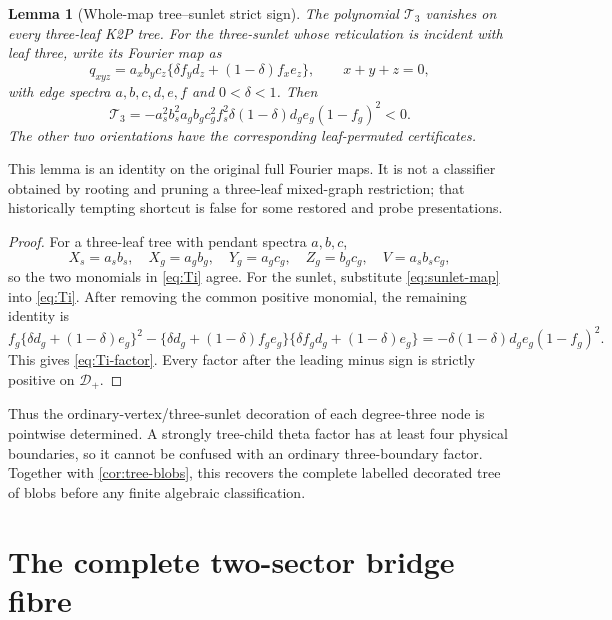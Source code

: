 \documentclass[11pt]{article}
\newtheorem{lemma}[theorem]{Lemma}
\theoremstyle{remark}
\newcommand{\Dplus}{\mathcal D_+}
\newcommand{\1}{\mathbf 1}
\begin{document}
\begin{lemma}[Whole-map tree--sunlet strict sign]\label{lem:Ti}
The polynomial \(\mathcal T_3\) vanishes on every three-leaf K2P tree.  For
the three-sunlet whose reticulation is incident with leaf three, write its
Fourier map as
\begin{equation}\label{eq:sunlet-map}
 q_{xyz}=a_xb_yc_z\{\delta f_y d_z+(1-\delta)f_xe_z\},
 \qquad x+y+z=0,
\end{equation}
with edge spectra \(a,b,c,d,e,f\) and \(0<\delta<1\).  Then
\begin{equation}\label{eq:Ti-factor}
 \mathcal T_3=
 -a_s^2b_s^2a_gb_gc_g^2f_s^2
 \delta(1-\delta)d_ge_g(1-f_g)^2<0.
\end{equation}
The other two orientations have the corresponding leaf-permuted
certificates.
\end{lemma}

This lemma is an identity on the original full Fourier maps.  It is not a
classifier obtained by rooting and pruning a three-leaf mixed-graph
restriction; that historically tempting shortcut is false for some restored
and probe presentations.

\begin{proof}
For a three-leaf tree with pendant spectra \(a,b,c\),
\[
 X_s=a_sb_s,\quad X_g=a_gb_g,\quad
 Y_g=a_gc_g,\quad Z_g=b_gc_g,\quad V=a_sb_sc_g,
\]
so the two monomials in \eqref{eq:Ti} agree.  For the sunlet, substitute
\eqref{eq:sunlet-map} into \eqref{eq:Ti}.  After removing the common positive
monomial, the remaining identity is
\[
 f_g\{\delta d_g+(1-\delta)e_g\}^2
 -\{\delta d_g+(1-\delta)f_ge_g\}
  \{\delta f_gd_g+(1-\delta)e_g\}
 =-\delta(1-\delta)d_ge_g(1-f_g)^2.
\]
This gives \eqref{eq:Ti-factor}.  Every factor after the leading minus sign
is strictly positive on \(\Dplus\).
\end{proof}

Thus the ordinary-vertex/three-sunlet decoration of each degree-three node is
pointwise determined.  A strongly tree-child theta factor has at least four
physical boundaries, so it cannot be confused with an ordinary three-boundary
factor.  Together with \cref{cor:tree-blobs}, this recovers the complete
labelled decorated tree of blobs before any finite algebraic classification.

\section{The complete two-sector bridge fibre}\label{sec:bridges}
\end{document}
